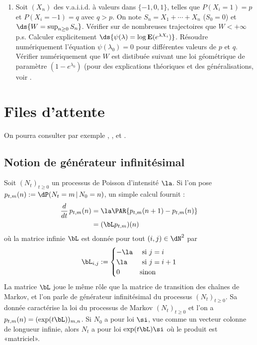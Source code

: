 {{\begin{enumerate}
  convergence dans $\mathbf{L}^1$ ?
\item Soit $(X_n)$ des v.a.i.i.d. à valeurs dans $\{-1,0,1\}$, telles que
  $P(X_i=1)=p$ et $P(X_i=-1)=q$ avec $q>p$. On note $S_n=X_1+\cdots+X_n$
  ($S_0=0$) et $\ds{W=\sup_{n \geq 0}S_n}$. Vérifier sur de
  nombreuses trajectoires que $W<+\infty$ p.s. Calculer explicitement
  $\ds{\psi(\lambda)=\log \mathbf{E}(e^{\lambda X_i})}$. Résoudre
  numériquement l'équation $\psi(\lambda_0)=0$ pour différentes valeurs de $p$
  et $q$. Vérifier numériquement que $W$ est distibuée suivant une loi
  géométrique de paramètre $(1-e^{\lambda_0})$ (pour des explications
  théoriques et des généralisations, voir \cite{baldi-mazliak-priouret}.
\end{enumerate}    

%
%
\chapter{Files d'attente}
%
%

On pourra consulter par exemple \cite{bon}, \cite{bouleau2},
\cite{dacunha-castelle-duflo-2} et \cite{ross-1}.


%
\section{Notion de générateur infinitésimal}
%

Soit $(N_t)_{t\geq 0}$ un processus de Poisson d'intensité $\la$. Si l'on pose
$p_{t,m}(n):=\dP(N_t=m\,\vert\,N_0=n)$, un simple calcul fournit :
\begin{align*}
\frac{d}{dt}\,p_{t,m}(n)
&=\la \PAR{p_{t,m}(n+1)-p_{t,m}(n)}\\
&=(\bL p_{t,m})(n)
\end{align*}
où la matrice infinie $\bL$ est donnée pour tout $(i,j)\in\dN^2$ par
$$
\bL_{i,j}:=
\begin{cases}
  -\la & \text{ si $j=i$} \\
  \la & \text{ si $j=i+1$} \\
  0 & \text{sinon}
\end{cases}
$$
La matrice $\bL$ joue le même rôle que la matrice de transition des chaînes
de Markov, et l'on parle de générateur infinitésimal du processus
$(N_t)_{t\geq 0}$. Sa donnée caractérise la loi du processus de Markov
$(N_t)_{t\geq 0}$ et l'on a $p_{t,m}(n)=(\exp(t\bL))_{m,n}$. Si $N_0$ a pour
loi $\si$, vue comme un vecteur colonne de longueur infinie, alors $N_t$ a
pour loi $\exp(t\bL)\si$ où le produit est «matriciel».

}}
